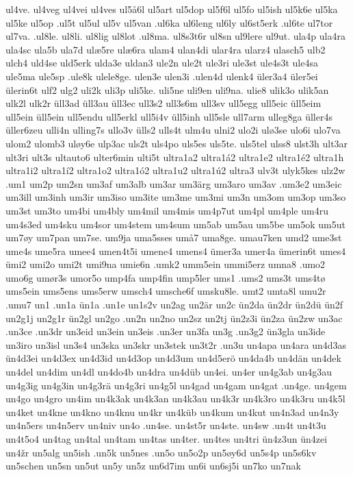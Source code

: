 {{ul4ve.
ul4veg
ul4vei
ul4ves
ul5å6l
ul5art
ul5dop
ul5f6l
ul5fo
ul5ish
ul5k6e
ul5ka
ul5ke
ul5op
.ul5t
ul5ul
ul5v
ul5van
.ul6ka
ul6leng
ul6ly
ul6st5erk
.ul6te
ul7tor
ul7va.
.ul8le.
ul8li.
ul8lig
ul8lot
.ul8ma.
ul8s3t6r
ul8sn
ul9lere
ul9ut.
ula4p
ula4ra
ula4sc
ula5b
ula7d
ulæ5re
ulæ6ra
ulam4
ulan4di
ular4ra
ularz4
ulasch5
ulb2
ulch4
uld4se
uld5erk
ulda3e
uldan3
ule2n
ule2t
ule3ri
ule3st
ule4s3t
ule4sa
ule5ma
ule5sp
.ule8k
ulele8ge.
ulen3e
ulen3i
.ulen4d
ulenk4
üler3a4
üler5ei
ülerin6t
ulf2
ulg2
uli2k
uli3p
uli5ke.
uli5ne
uli9en
uli9na.
ulie8
ulik3o
ulik5an
ulk2l
ulk2r
üll3ad
üll3au
üll3ec
ull3s2
ull3s6m
ull3sv
ull5egg
ull5eic
üll5eim
ull5ein
üll5ein
ull5endu
ull5erkl
ull5i4v
üll5inh
ull5sle
ull7arm
ulleg8ga
üller4s
üller6zeu
ulli4n
ulling7s
ullo3v
ülls2
ulls4t
ulm4u
ulni2
ulo2i
ulø3se
ulo6i
ulo7va
ulom2
ulomb3
uløy6e
ulp3ac
uls2t
uls4po
uls5es
uls5te.
uls5tel
ulss8
ulst3h
ult3ar
ult3ri
ult3s
ultauto6
ulter6min
ulti5t
ultra1a2
ultra1á2
ultra1e2
ultra1é2
ultra1h
ultra1i2
ultra1í2
ultra1o2
ultra1ó2
ultra1u2
ultra1ú2
ultra3
ulv3t
ulyk5kes
ulz2w
.um1
um2p
um2sn
um3af
um3alb
um3ar
um3ärg
um3aro
um3av
.um3e2
um3eic
um3ill
um3inh
um3ir
um3iso
um3ite
um3me
um3mi
um3n
um3om
um3op
um3so
um3st
um3to
um4bi
um4bly
um4mil
um4mis
um4p7ut
um4pl
um4ple
um4ru
um4s3ed
um4sku
um4sor
um4stem
um4sum
um5ab
um5au
um5be
um5ok
um5ut
um7øy
um7pan
um7se.
um9ja
uma5sses
umå7
uma8ge.
umau7ken
umd2
ume3st
ume4s
ume5ra
umee4
umen4t5i
umene4
umens4
ümer3a
umer4a
ümerin6t
umes4
ümi2
umi2o
umi2t
umi9na
umie6n
.umk2
umm5ein
ummi5erz
umna8
.umo2
umo6g
umør3s
umor5o
ump4fa
ump4fin
ump5ler
ums1
.ums2
ums3t
ums4tø
ums5ein
ums5ens
ums5erw
umsch4
umsche6f
umsku8le.
umt2
umta8l
umu2r
.umu7
un1
.un1a
ün1a
.un1e
un1s2v
un2ag
un2är
un2c
ün2da
ün2dr
ün2dü
ün2f
un2g1j
un2g1r
ün2gl
un2go
.un2n
un2no
un2sz
un2tj
ün2z3i
ün2za
ün2zw
un3ac
.un3ce
.un3dr
un3eid
un3ein
un3eis
.un3er
un3fa
un3g
.un3g2
ün3gla
un3ide
un3iro
un3isl
un3s4
un3ska
un3skr
un3stek
un3t2r
.un3u
un4apa
un4ara
un4d3as
ün4d3ei
un4d3ex
un4d3id
un4d3op
un4d3um
un4d5erö
un4da4b
un4dän
un4dek
un4del
un4dim
un4dl
un4do4b
un4dra
un4düb
un4ei.
un4er
un4g3ab
un4g3au
un4g3ig
un4g3in
un4g3rä
un4g3ri
un4g5l
un4gad
un4gam
un4gat
.un4ge.
un4gem
un4go
un4gro
un4im
un4k3ak
un4k3an
un4k3au
un4k3r
un4k3ro
un4k3ru
un4k5l
un4ket
un4kne
un4kno
un4knu
un4kr
un4küb
un4kum
un4kut
un4n3ad
un4n3y
un4n5ers
un4n5erv
un4niv
un4o
.un4se.
un4st5r
un4ste.
un4sw
.un4t
un4t3u
un4t5o4
un4tag
un4tal
un4tam
un4tas
un4ter.
un4tes
un4tri
ün4z3un
ün4zei
un4žr
un5alg
un5ish
.un5k
un5nes
.un5o
un5o2p
un5øy6d
un5s4p
un5s6kv
un5schen
un5sn
un5ut
un5y
un5z
un6d7im
un6i
un6sj5i
un7ko
un7nak
}}
